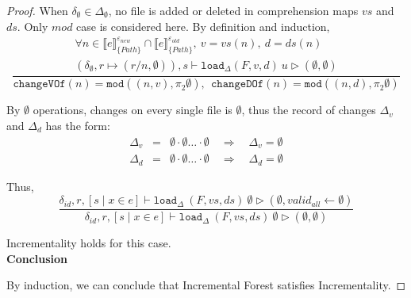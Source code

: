 \documentclass[10pt,twoside,a4paper]{article}
\theoremstyle{theorem}
\theoremstyle{lemma}
\theoremstyle{property}
\theoremstyle{definition}
\theoremstyle{assumption}
\def\snd{\pi_2}
\begin{document}
\begin{proof}
	When $\delta_{\emptyset} \in \Delta_{\emptyset}$, no file is added or deleted in comprehension maps $vs$ and $ds$. Only $mod$ case is considered here. By definition and induction,
	\begin{displaymath}
		\frac{\begin{array}{c}
		\forall n \in \llbracket e \rrbracket^{\varepsilon_{new}}_{\{Path\}} \cap \llbracket e \rrbracket^{\varepsilon_{old}}_{\{Path\}}, ~ v = vs(n), ~d = ds(n)\\
		(\delta_{\emptyset}, r \mapsto (r/n, \emptyset)), s \vdash \mathtt{load}_\Delta (F,v,d)~ u \rhd (\emptyset,\emptyset)
		\end{array}}
		{\mathtt{changeVOf}(n) = \mathtt{mod}((n,v), \snd\emptyset), ~~\mathtt{changeDOf}(n) = \mathtt{mod}((n,d), \snd\emptyset)}
	\end{displaymath}

	By $\emptyset$ operations, changes on every single file is $\emptyset$, thus the record of changes $\Delta_v$ and $\Delta_d$ has the form:
	\begin{eqnarray*}
		\Delta_v &=& \emptyset \cdot \emptyset \dots \cdot \emptyset \quad \Rightarrow \quad \Delta_v = \emptyset\\
		\Delta_d &=& \emptyset \cdot \emptyset \dots \cdot \emptyset \quad \Rightarrow \quad \Delta_d = \emptyset
	\end{eqnarray*}

	Thus,
	\begin{displaymath}
	\frac
	{\delta_{id}, r, [ s \mid x \in e] \vdash \mathtt{load}_\Delta~ (F,vs,ds)~ \emptyset \rhd (\emptyset, valid_{all} \leftarrow \emptyset)}
	{\delta_{id}, r, [ s \mid x \in e] \vdash \mathtt{load}_\Delta~ (F,vs,ds)~ \emptyset \rhd (\emptyset, \emptyset)}
	\end{displaymath}

	Incrementality holds for this case.\\

	\textbf{Conclusion}

	By induction, we can conclude that Incremental Forest satisfies Incrementality.
\end{proof}
\end{document}
